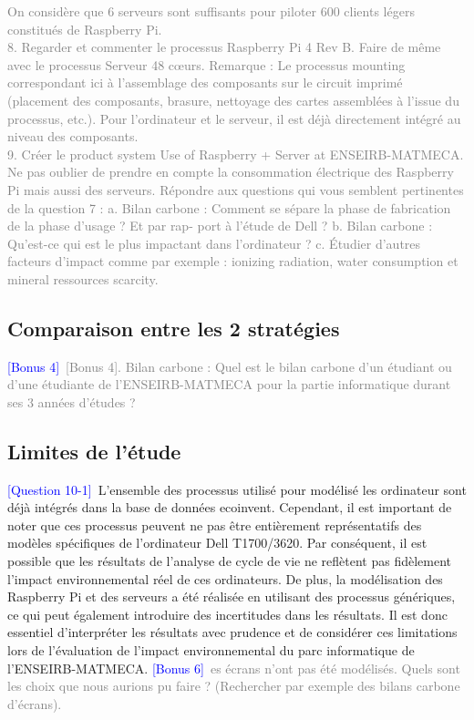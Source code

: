 \documentclass[12pt,a4paper]{paper}
\begin{document}
\textcolor{gray}{
On considère que 6 serveurs sont suffisants pour piloter 600 clients légers constitués de Raspberry
Pi.\\ 8. Regarder et commenter le processus Raspberry Pi 4 Rev B. Faire de même avec le processus
Serveur 48 cœurs. Remarque : Le processus mounting correspondant ici à l’assemblage des composants sur le circuit imprimé (placement des composants, brasure, nettoyage des cartes
assemblées à l’issue du processus, etc.). Pour l’ordinateur et le serveur, il est déjà directement intégré au niveau des composants.\\ 9. Créer le product system Use of Raspberry + Server at ENSEIRB-MATMECA. Ne pas oublier de prendre en compte la consommation électrique des Raspberry Pi mais aussi des serveurs. Répondre aux questions qui vous semblent pertinentes de la question 7 :}
\textcolor{gray}{a. Bilan carbone : Comment se sépare la phase de fabrication de la phase d’usage ? Et par rap-}
\textcolor{gray}{port à l’étude de Dell ?}
\textcolor{gray}{b. Bilan carbone : Qu’est-ce qui est le plus impactant dans l’ordinateur ?}
\textcolor{gray}{c. Étudier d’autres facteurs d’impact comme par exemple : ionizing radiation, water consumption}
\textcolor{gray}{et mineral ressources scarcity.}
\subsection{Comparaison entre les 2 stratégies}
\textcolor{blue}{[Bonus 4]}~\textcolor{gray}{[Bonus 4]. Bilan carbone : Quel est le bilan carbone d’un étudiant ou d’une étudiante de}
\textcolor{gray}{l’ENSEIRB-MATMECA pour la partie informatique durant ses 3 années d’études ?}
\textcolor{gray}{\lipsum[1-2] }
\subsection{Limites de l'étude}
\textcolor{blue}{[Question 10-1]}~L'ensemble des processus utilisé pour modélisé les ordinateur sont déjà intégrés dans la base de données ecoinvent. Cependant, il est important de noter que ces processus peuvent ne pas être entièrement représentatifs des modèles spécifiques de l'ordinateur Dell T1700/3620. Par conséquent, il est possible que les résultats de l'analyse de cycle de vie ne reflètent pas fidèlement l'impact environnemental réel de ces ordinateurs. De plus, la modélisation des Raspberry Pi et des serveurs a été réalisée en utilisant des processus génériques, ce qui peut également introduire des incertitudes dans les résultats. Il est donc essentiel d'interpréter les résultats avec prudence et de considérer ces limitations lors de l'évaluation de l'impact environnemental du parc informatique de l'ENSEIRB-MATMECA.
\textcolor{blue}{[Bonus 6]}~\textcolor{gray}{es écrans n’ont pas été modélisés. Quels sont les choix que nous aurions pu faire ?
(Rechercher par exemple des bilans carbone d’écrans).}
\end{document}
